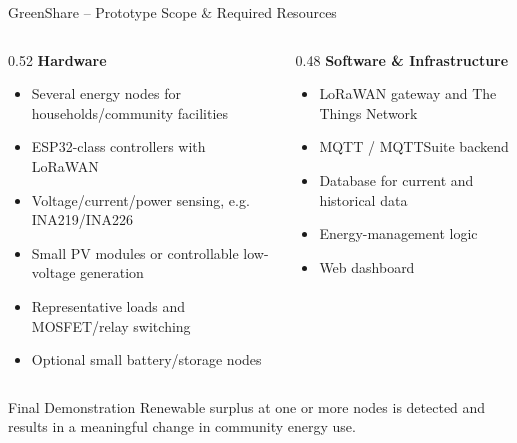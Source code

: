 \begin{frame}{GreenShare -- Prototype Scope \& Required Resources}
\small
\begin{columns}[T,onlytextwidth]
    \begin{column}{0.52\textwidth}
        \textbf{Hardware}
        \begin{itemize}
            \item Several energy nodes for households/community facilities
            \item ESP32-class controllers with LoRaWAN
            \item Voltage/current/power sensing, e.g. INA219/INA226
            \item Small PV modules or controllable low-voltage generation
            \item Representative loads and MOSFET/relay switching
            \item Optional small battery/storage nodes
        \end{itemize}
    \end{column}
    \begin{column}{0.48\textwidth}
        \textbf{Software \& Infrastructure}
        \begin{itemize}
            \item LoRaWAN gateway and The Things Network
            \item MQTT / MQTTSuite backend
            \item Database for current and historical data
            \item Energy-management logic
            \item Web dashboard
        \end{itemize}
    \end{column}
\end{columns}

\begin{block}{Final Demonstration}
Renewable surplus at one or more nodes is detected and results in a meaningful change in community energy use.
\end{block}
\end{frame}
